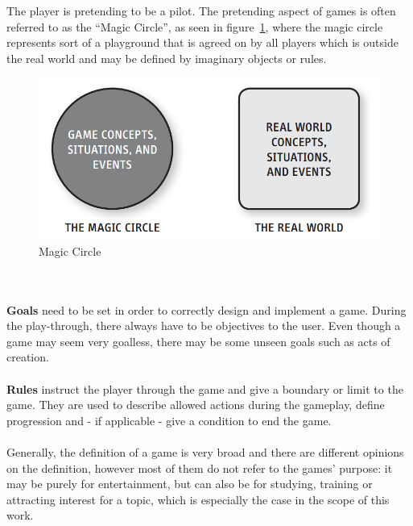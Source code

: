 The player is pretending to be a pilot. 
The pretending aspect of games is often referred to as the ``Magic Circle'', as seen in figure~\ref{fig:magic-circle}, where the magic circle represents sort of a
playground that is agreed on by all players which is outside the real world and may be defined by imaginary objects or rules.
\begin{figure}
    \centering
    \includegraphics[width=\textwidth]{./Pictures/res/fundamentals/magic-circle}
    \caption{Magic Circle~\cite{10.5555/2544002}}
    \label{fig:magic-circle}
\end{figure}
\\
\\
\textbf{Goals} need to be set in order to correctly design and implement a game.
During the play-through, there always have to be objectives to the user.
Even though a game may seem very goalless, there may be some unseen goals such as acts of creation.
\\
\\
\textbf{Rules} instruct the player through the game and give a boundary or limit to the game.
They are used to describe allowed actions during the gameplay, define progression and - if applicable - give a condition to
end the game.
\\
\\
Generally, the definition of a game is very broad and there are different opinions on the definition, however most of them
do not refer to the games' purpose: it may be purely for entertainment, but can also be for studying, training or attracting interest
for a topic, which is especially the case in the scope of this work.

